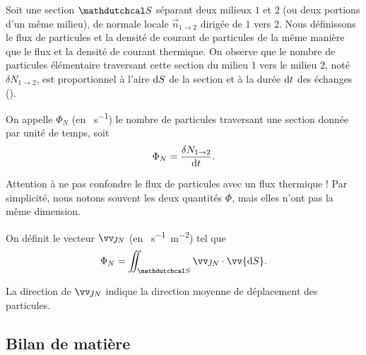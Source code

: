 \documentclass[12pt,fancy]{cours}
\begin{document}
Soit une section $\Surf$ séparant deux milieux $1$ et $2$ (ou deux portions d’un même milieu), de normale locale $\Vec{n}_{1\rightarrow2}$ dirigée de $1$ vers $2$. Nous définissons le flux de particules et la densité de courant de particules de la même manière que le flux et la densité de courant thermique.
On observe que le nombre de particules élémentaire traversant cette section du milieu $1$ vers le milieu $2$, noté $\delta N_{1\rightarrow 2} $, est proportionnel à l’aire $\mathrm{d} S$ de la section et à la durée $\mathrm{d} t$ des échanges (). %
\begin{definition}
On appelle  $\Phi_N$ (en \SI{}{s^{-1}}) le nombre de particules traversant une section donnée par unité de temps, soit
\begin{equation*}\label{eq:jth}
\Phi_N = \frac{\delta N_{1\rightarrow 2}}{\mathrm{d} t}.
\end{equation*}
\end{definition}
\begin{remarque}
Attention à ne pas confondre le flux de particules avec un flux thermique ! Par simplicité, nous notons souvent les deux quantités $\Phi$, mais elles n’ont pas la même dimension.
\end{remarque}
\begin{definition}\label{def:jth}
On définit le vecteur  $\Vec{\jN}$ (en \SI{}{s^{-1}.m^{-2}}) tel que
\begin{equation*}
\Phi_N = \iint_{\Surf}\Vec{\jN}\cdot\vv{\d S}.
\end{equation*}
\end{definition}
\noindent
La direction de $\Vec{\jN}$ indique la direction moyenne de déplacement des particules.

\subsection{Bilan de matière}
\label{sec:conserv}
\end{document}
